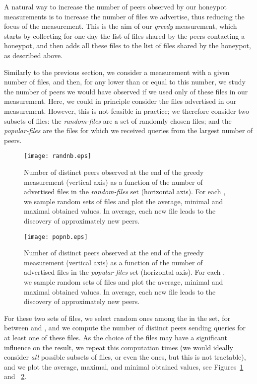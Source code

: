 \documentclass[final,
notitlepage,
narroweqnarray,
	inline,
	twoside,
]{ieee}
\begin{document}
A natural way to increase the number of peers observed by our honeypot
measurements is to increase the number of files we advertise, thus
reducing the focus of the measurement. This is the aim of our {\em
  greedy} measurement, which starts by collecting for one day the list
of files shared by the peers contacting a honeypot, and then adds all
these files to the list of files shared by the honeypot, as described
above.

Similarly to the previous section, we consider a measurement with a given number of files, and then, for any  lower than or equal to this number, we study the number of peers we would have observed if we used only  of these files in our measurement. Here, we could in principle consider the  files advertised in our measurement. However, this is not feasible in practice; we therefore consider two subsets of files: the {\em random-files} are a set of  randomly chosen files; and the {\em popular-files} are the  files for which we received queries from the largest number of peers.

\begin{figure}[h!]
\centering
\texttt{[image: randnb.eps]}
\caption{Number of distinct peers observed at the end of the greedy measurement (vertical axis) as a function of the number  of advertised files in the {\em random-files} set (horizontal axis). For each , we sample  random sets of  files and plot the average, minimal and maximal obtained values. In average, each new file leads to the discovery of approximately  new peers.}
\label{fig-file-rand}
\end{figure}

\begin{figure}[h!]
\centering
\texttt{[image: popnb.eps]}
\caption{Number of distinct peers observed at the end of the greedy measurement (vertical axis) as a function of the number  of advertised files in the {\em popular-files} set (horizontal axis). For each , we sample  random sets of  files and plot the average, minimal and maximal obtained values. In average, each new file leads to the discovery of approximately  new peers.} 
\label{fig-file-pop}
\end{figure}

For these two sets of files, we select  random ones among the  in the set, for  between  and , and we compute the number of distinct peers sending queries for at least one of these files. As the choice of the  files may have a significant influence on the result, we repeat this computation  times (we would ideally consider {\em all}  possible subsets of files, or even the  ones, but this is not tractable), and we plot the average, maximal, and minimal obtained values, see Figures~\ref{fig-file-rand} and ~\ref{fig-file-pop}.
\end{document}
